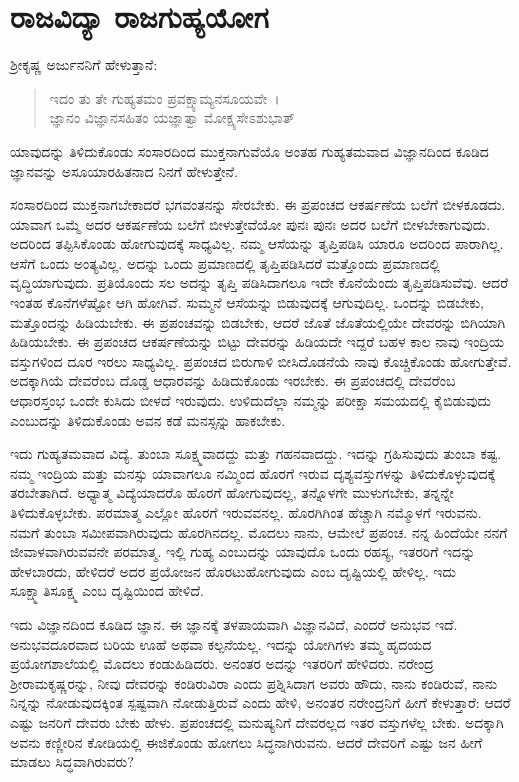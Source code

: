
\chapter{ರಾಜವಿದ್ಯಾ ರಾಜಗುಹ್ಯಯೋಗ}

ಶ‍್ರೀಕೃಷ್ಣ ಅರ್ಜುನನಿಗೆ ಹೇಳುತ್ತಾನೆ:

\begin{verse}
ಇದಂ ತು ತೇ ಗುಹ್ಯತಮಂ ಪ್ರವಕ್ಷ್ಯಾಮ್ಯನಸೂಯವೇ~।\\ಜ್ಞಾನಂ ವಿಜ್ಞಾನಸಹಿತಂ ಯಜ್ಞಾತ್ವಾ ಮೋಕ್ಷ್ಯಸೇಽಶುಭಾತ್ 
\end{verse}

{\small ಯಾವುದನ್ನು ತಿಳಿದುಕೊಂಡು ಸಂಸಾರದಿಂದ ಮುಕ್ತನಾಗುವೆಯೊ ಅಂತಹ ಗುಹ್ಯತಮವಾದ ವಿಜ್ಞಾನದಿಂದ ಕೂಡಿದ ಜ್ಞಾನವನ್ನು ಅಸೂಯಾರಹಿತನಾದ ನಿನಗೆ ಹೇಳುತ್ತೇನೆ.}

ಸಂಸಾರದಿಂದ ಮುಕ್ತನಾಗಬೇಕಾದರೆ ಭಗವಂತನನ್ನು ಸೇರಬೇಕು. ಈ ಪ್ರಪಂಚದ ಆಕರ್ಷಣೆಯ ಬಲೆಗೆ ಬೀಳಕೂಡದು. ಯಾವಾಗ ಒಮ್ಮೆ ಅದರ ಆಕರ್ಷಣೆಯ ಬಲೆಗೆ ಬೀಳುತ್ತೇವೆಯೋ ಪುನಃ ಪುನಃ ಅದರ ಬಲೆಗೆ ಬೀಳಬೇಕಾಗುವುದು. ಅದರಿಂದ ತಪ್ಪಿಸಿಕೊಂಡು ಹೋಗುವುದಕ್ಕೆ ಸಾಧ್ಯವಿಲ್ಲ. ನಮ್ಮ ಆಸೆಯನ್ನು ತೃಪ್ತಿಪಡಿಸಿ ಯಾರೂ ಅದರಿಂದ ಪಾರಾಗಿಲ್ಲ. ಆಸೆಗೆ ಒಂದು ಅಂತ್ಯವಿಲ್ಲ. ಅದನ್ನು ಒಂದು ಪ್ರಮಾಣದಲ್ಲಿ ತೃಪ್ತಿಪಡಿಸಿದರೆ ಮತ್ತೊಂದು ಪ್ರಮಾಣದಲ್ಲಿ ವೃದ್ಧಿಯಾಗುವುದು. ಪ್ರತಿಯೊಂದು ಸಲ ಅದನ್ನು ತೃಪ್ತಿ ಪಡಿಸಿದಾಗಲೂ ಇದೇ ಕೊನೆಯೆಂದು ತೃಪ್ತಿಪಡಿಸುವೆವು. ಆದರೆ ಇಂತಹ ಕೊನೆಗಳೆಷ್ಟೋ ಆಗಿ ಹೋಗಿವೆ. ಸುಮ್ಮನೆ ಆಸೆಯನ್ನು ಬಿಡುವುದಕ್ಕೆ ಆಗುವುದಿಲ್ಲ. ಒಂದನ್ನು ಬಿಡಬೇಕು, ಮತ್ತೊಂದನ್ನು ಹಿಡಿಯಬೇಕು. ಈ ಪ್ರಪಂಚವನ್ನು ಬಿಡಬೇಕು, ಆದರೆ ಜೊತೆ ಜೊತೆಯಲ್ಲಿಯೇ ದೇವರನ್ನು ಬಿಗಿಯಾಗಿ ಹಿಡಿಯಬೇಕು. ಈ ಪ್ರಪಂಚದ ಆಕರ್ಷಣೆಯನ್ನು ಬಿಟ್ಟು ದೇವರನ್ನು ಹಿಡಿಯದೇ ಇದ್ದರೆ ಬಹಳ ಕಾಲ ನಾವು ಇಂದ್ರಿಯ ವಸ್ತುಗಳಿಂದ ದೂರ ಇರಲು ಸಾಧ್ಯವಿಲ್ಲ. ಪ್ರಪಂಚದ ಬಿರುಗಾಳಿ ಬೀಸಿದೊಡನೆಯೆ ನಾವು ಕೊಚ್ಚಿಕೊಂಡು ಹೋಗುತ್ತೇವೆ. ಅದಕ್ಕಾಗಿಯೆ ದೇವರೆಂಬ ದೊಡ್ಡ ಆಧಾರವನ್ನು ಹಿಡಿದುಕೊಂಡು ಇರಬೇಕು. ಈ ಪ್ರಪಂಚದಲ್ಲಿ ದೇವರೆಂಬ ಆಧಾರಸ್ತಂಭ ಒಂದೇ ಕುಸಿದು ಬೀಳದೆ ಇರುವುದು. ಉಳಿದುದೆಲ್ಲಾ ನಮ್ಮನ್ನು ಪರೀಕ್ಷಾ ಸಮಯದಲ್ಲಿ ಕೈಬಿಡುವುದು ಎಂಬುದನ್ನು ತಿಳಿದುಕೊಂಡು ಅವನ ಕಡೆ ಮನಸ್ಸನ್ನು ಹಾಕಬೇಕು.

ಇದು ಗುಹ್ಯತಮವಾದ ವಿದ್ಯೆ. ತುಂಬಾ ಸೂಕ್ಷ್ಮವಾದದ್ದು ಮತ್ತು ಗಹನವಾದದ್ದು. ಇದನ್ನು ಗ್ರಹಿಸುವುದು ತುಂಬಾ ಕಷ್ಟ. ನಮ್ಮ ಇಂದ್ರಿಯ ಮತ್ತು ಮನಸ್ಸು ಯಾವಾಗಲೂ ನಮ್ಮಿಂದ ಹೊರಗೆ ಇರುವ ದೃಶ್ಯವಸ್ತುಗಳನ್ನು ತಿಳಿದುಕೊಳ್ಳುವುದಕ್ಕೆ ತರಬೇತಾಗಿದೆ. ಅಧ್ಯಾತ್ಮ ವಿದ್ಯೆಯಾದರೊ ಹೊರಗೆ ಹೋಗುವುದಲ್ಲ, ತನ್ನೊಳಗೇ ಮುಳುಗಬೇಕು, ತನ್ನನ್ನೇ ತಿಳಿದುಕೊಳ್ಳಬೇಕು. ಪರಮಾತ್ಮ ಎಲ್ಲೋ ಹೊರಗೆ ಇರುವವನಲ್ಲ. ಹೊರಗಿಗಿಂತ ಹೆಚ್ಚಾಗಿ ನಮ್ಮೊಳಗೆ ಇರುವನು. ನಮಗೆ ತುಂಬಾ ಸಮೀಪವಾಗಿರುವುದು ಹೊರಗಿನದಲ್ಲ. ಮೊದಲು ನಾನು, ಆಮೇಲೆ ಪ್ರಪಂಚ. ನನ್ನ ಹಿಂದೆಯೇ ನನಗೆ ಜೀವಾಳವಾಗಿರುವವನೇ ಪರಮಾತ್ಮ. ಇಲ್ಲಿ ಗುಹ್ಯ ಎಂಬುದನ್ನು ಯಾವುದೊ ಒಂದು ರಹಸ್ಯ, ಇತರರಿಗೆ ಇದನ್ನು ಹೇಳಬಾರದು, ಹೇಳಿದರೆ ಅದರ ಪ್ರಯೋಜನ ಹೊರಟುಹೋಗುವುದು ಎಂಬ ದೃಷ್ಟಿಯಲ್ಲಿ ಹೇಳಿಲ್ಲ. ಇದು ಸೂಕ್ಷ್ಮಾತಿಸೂಕ್ಷ್ಮ ಎಂಬ ದೃಷ್ಟಿಯಿಂದ ಹೇಳಿದೆ.

ಇದು ವಿಜ್ಞಾನದಿಂದ ಕೂಡಿದ ಜ್ಞಾನ. ಈ ಜ್ಞಾನಕ್ಕೆ ತಳಪಾಯವಾಗಿ ವಿಜ್ಞಾನವಿದೆ, ಎಂದರೆ ಅನುಭವ ಇದೆ. ಅನುಭವದೂರವಾದ ಬರಿಯ ಊಹೆ ಅಥವಾ ಕಲ್ಪನೆಯಲ್ಲ. ಇದನ್ನು ಯೋಗಿಗಳು ತಮ್ಮ ಹೃದಯದ ಪ್ರಯೋಗಶಾಲೆಯಲ್ಲಿ ಮೊದಲು ಕಂಡುಹಿಡಿದರು. ಅನಂತರ ಅದನ್ನು ಇತರರಿಗೆ ಹೇಳಿದರು. ನರೇಂದ್ರ ಶ‍್ರೀರಾಮಕೃಷ್ಣರನ್ನು, ನೀವು ದೇವರನ್ನು ಕಂಡಿರುವಿರಾ ಎಂದು ಪ್ರಶ್ನಿಸಿದಾಗ ಅವರು ಹೌದು, ನಾನು ಕಂಡಿರುವೆ, ನಾನು ನಿನ್ನನ್ನು ನೋಡುವುದಕ್ಕಿಂತ ಸ್ಪಷ್ಟವಾಗಿ ನೋಡುತ್ತಿರುವೆ ಎಂದು ಹೇಳಿ, ಅನಂತರ ನರೇಂದ್ರನಿಗೆ ಹೀಗೆ ಕೇಳುತ್ತಾರೆ: ಆದರೆ ಎಷ್ಟು ಜನರಿಗೆ ದೇವರು ಬೇಕು ಹೇಳು. ಪ್ರಪಂಚದಲ್ಲಿ ಮನುಷ್ಯನಿಗೆ ದೇವರಲ್ಲದ ಇತರ ವಸ್ತುಗಳೆಲ್ಲ ಬೇಕು. ಅದಕ್ಕಾಗಿ ಅವನು ಕಣ್ಣೀರಿನ ಕೋಡಿಯಲ್ಲಿ ಈಜಿಕೊಂಡು ಹೋಗಲು ಸಿದ್ಧನಾಗಿರುವನು. ಆದರೆ ದೇವರಿಗೆ ಎಷ್ಟು ಜನ ಹೀಗೆ ಮಾಡಲು ಸಿದ್ಧವಾಗಿರುವರು?


